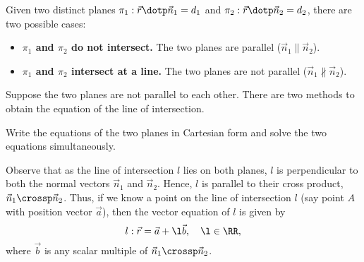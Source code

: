 \begin{fact}
    Given two distinct planes $\pi_1 : \vec r \dotp \vec n_1 = d_1$ and $\pi_2 : \vec r \dotp \vec n_2 = d_2$, there are two possible cases:
    \begin{itemize}
        \item \textbf{$\pi_1$ and $\pi_2$ do not intersect.} The two planes are parallel ($\vec n_1 \parallel \vec n_2$).
        \item \textbf{$\pi_1$ and $\pi_2$ intersect at a line.} The two planes are not parallel ($\vec n_1 \nparallel \vec n_2$).
    \end{itemize}
\end{fact}

Suppose the two planes are not parallel to each other. There are two methods to obtain the equation of the line of intersection.

\begin{method}
    Write the equations of the two planes in Cartesian form and solve the two equations simultaneously.
\end{method}
\begin{method}
    Observe that as the line of intersection $l$ lies on both planes, $l$ is perpendicular to both the normal vectors $\vec n_1$ and $\vec n_2$. Hence, $l$ is parallel to their cross product, $\vec n_1 \crossp \vec n_2$. Thus, if we know a point on the line of intersection $l$ (say point $A$ with position vector $\vec a$), then the vector equation of $l$ is given by \[l : \vec r = \vec a + \l \vec b, \quad \l \in \RR,\] where $\vec b$ is any scalar multiple of $\vec n_1 \crossp \vec n_2$.
\end{method}
